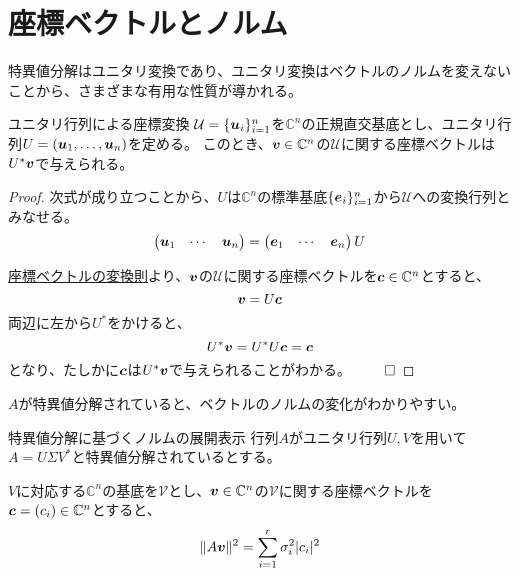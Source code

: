\documentclass[../../../topic_linear-algebra]{subfiles}
\begin{document}
\sectionline
\section{座標ベクトルとノルム}

特異値分解はユニタリ変換であり、ユニタリ変換はベクトルのノルムを変えないことから、さまざまな有用な性質が導かれる。

\begin{theorem}{ユニタリ行列による座標変換}\label{thm:unitary-coordinate-transform}
  $\mathcal{U} = \{ \vb*{u}_i \}_{i=1}^n$を$\mathbb{C}^n$の正規直交基底とし、ユニタリ行列$U = (\vb*{u}_1, \ldots, \vb*{u}_n)$を定める。
  このとき、$\vb*{v} \in \mathbb{C}^n$の$\mathcal{U}$に関する座標ベクトルは$U^*\vb*{v}$で与えられる。
\end{theorem}

\begin{proof}
  次式が成り立つことから、$U$は$\mathbb{C}^n$の標準基底$\{ \vb*{e}_i \}_{i=1}^n$から$\mathcal{U}$への変換行列とみなせる。
  \begin{equation*}
    \begin{pmatrix}
      \vb*{u}_1 & \cdots & \vb*{u}_n
    \end{pmatrix} = \begin{pmatrix}
      \vb*{e}_1 & \cdots & \vb*{e}_n
    \end{pmatrix} U
  \end{equation*}
  
  \hyperref[thm:coordinate-change-rule]{座標ベクトルの変換則}より、$\vb*{v}$の$\mathcal{U}$に関する座標ベクトルを$\vb*{c} \in \mathbb{C}^n$とすると、
  \begin{equation*}
    \vb*{v} = U \vb*{c}
  \end{equation*}
  両辺に左から$U^*$をかけると、
  \begin{equation*}
    U^* \vb*{v} = U^* U \vb*{c} = \vb*{c}
  \end{equation*}
  となり、たしかに$\vb*{c}$は$U^* \vb*{v}$で与えられることがわかる。 $\qed$
\end{proof}

\br

$A$が特異値分解されていると、ベクトルのノルムの変化がわかりやすい。

\begin{theorem}{特異値分解に基づくノルムの展開表示}\label{thm:norm-expansion-svd}
  行列$A$がユニタリ行列$U,V$を用いて$A = U \Sigma V^*$と特異値分解されているとする。
  
  $V$に対応する$\mathbb{C}^n$の基底を$\mathcal{V}$とし、$\vb*{v} \in \mathbb{C}^n$の$\mathcal{V}$に関する座標ベクトルを$\vb*{c} = (c_i) \in \mathbb{C}^n$とすると、
  \begin{equation*}
    \| A \vb*{v} \|^2 = \sum_{i=1}^r \sigma_i^2 |c_i|^2
  \end{equation*}
\end{theorem}
\end{document}
